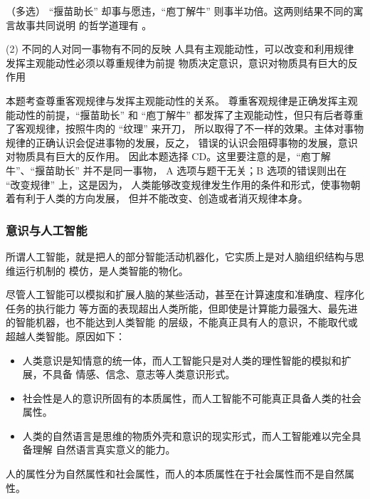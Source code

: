 \documentclass[11pt, UTF8]{book} %
\begin{document}
\begin{example}
    （多选）
    “揠苗助长” 却事与愿违，“庖丁解牛” 则事半功倍。这两则结果不同的寓言故事共同说明
    的哲学道理有 \underline{\qquad \qquad \qquad}。
    \begin{tasks}[label={\Alph*.}](2)
        \task 不同的人对同一事物有不同的反映
        \task 人具有主观能动性，可以改变和利用规律
        \task 发挥主观能动性必须以尊重规律为前提
        \task 物质决定意识，意识对物质具有巨大的反作用
    \end{tasks}
    \begin{cmt}
        本题考查尊重客观规律与发挥主观能动性的关系。
        尊重客观规律是正确发挥主观能动性的前提，“揠苗助长” 和 “庖丁解牛”
        都发挥了主观能动性，但只有后者尊重了客观规律，按照牛肉的 “纹理” 来开刀，
        所以取得了不一样的效果。主体对事物规律的正确认识会促进事物的发展，反之，
        错误的认识会阻碍事物的发展，意识对物质具有巨大的反作用。
        因此本题选择 CD。这里要注意的是，“庖丁解牛”、“揠苗助长” 并不是同一事物，
        A 选项与题干无关；B 选项的错误则出在 “改变规律” 上，这是因为，
        人类能够改变规律发生作用的条件和形式，使事物朝着有利于人类的方向发展，
        但并不能改变、创造或者消灭规律本身。
    \end{cmt}
\end{example}

\subsubsection{意识与人工智能}

所谓人工智能，就是把人的部分智能活动机器化，它实质上是对人脑组织结构与思维运行机制的
模仿，是人类智能的物化。

尽管人工智能可以模拟和扩展人脑的某些活动，甚至在计算速度和准确度、程序化任务的执行能力
等方面的表现超出人类所能，但即使是计算能力最强大、最先进的智能机器，也不能达到人类智能
的层级，不能真正具有人的意识，不能取代或超越人类智能。原因如下：
\begin{itemize}[itemsep=0pt]
    \item 人类意识是知情意的统一体，而人工智能只是对人类的理性智能的模拟和扩展，不具备
    情感、信念、意志等人类意识形式。
    \item 社会性是人的意识所固有的本质属性，而人工智能不可能真正具备人类的社会属性。
    \item 人类的自然语言是思维的物质外壳和意识的现实形式，而人工智能难以完全具备理解
    自然语言真实意义的能力。
\end{itemize}
\begin{remark}
    人的属性分为自然属性和社会属性，而人的本质属性在于社会属性而不是自然属性。
\end{remark}
\end{document}
